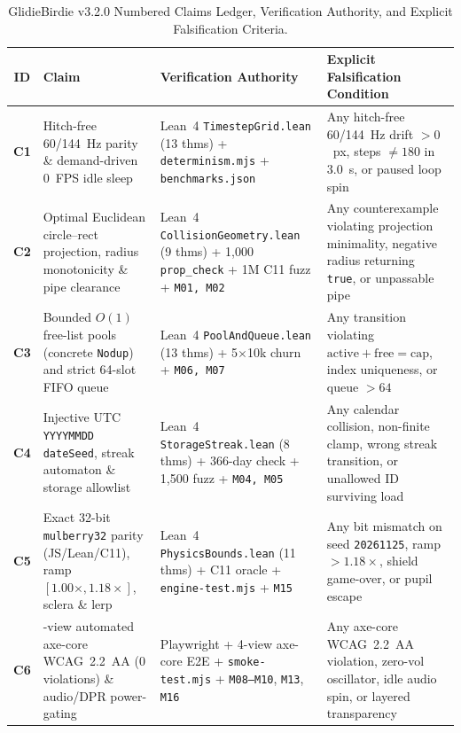 \documentclass[11pt,letterpaper]{article}
\theoremstyle{remark}
\begin{document}
\begin{table}[ht]
\centering
\caption{GlidieBirdie v3.2.0 Numbered Claims Ledger, Verification Authority, and Explicit Falsification Criteria.}
\label{tab:claims}
\footnotesize
\setlength{\tabcolsep}{4pt}
\begin{tabular}{@{} c >{\raggedright\arraybackslash}p{4.2cm} >{\raggedright\arraybackslash}p{4.5cm} >{\raggedright\arraybackslash}p{5.5cm} @{}}
\toprule
\textbf{ID} & \textbf{Claim} & \textbf{Verification Authority} & \textbf{Explicit Falsification Condition} \\
\midrule
\textbf{C1} & Hitch-free 60/144~Hz parity \& demand-driven 0~FPS idle sleep & Lean~4 \texttt{TimestepGrid.lean} (13 thms) + \texttt{determinism.mjs} + \texttt{benchmarks.json} & Any hitch-free 60/144~Hz drift $>0$~px, steps $\neq 180$ in 3.0~s, or paused loop spin \\
\textbf{C2} & Optimal Euclidean circle--rect projection, radius monotonicity \& pipe clearance & Lean~4 \texttt{CollisionGeometry.lean} (9 thms) + 1,000 \texttt{prop\_check} + 1M C11 fuzz + \texttt{M01, M02} & Any counterexample violating projection minimality, negative radius returning \texttt{true}, or unpassable pipe \\
\textbf{C3} & Bounded $O(1)$ free-list pools (concrete \texttt{Nodup}) and strict 64-slot FIFO queue & Lean~4 \texttt{PoolAndQueue.lean} (13 thms) + 5$\times$10k churn + \texttt{M06, M07} & Any transition violating $\text{active}+\text{free}=\text{cap}$, index uniqueness, or queue $>64$ \\
\textbf{C4} & Injective UTC \texttt{YYYYMMDD} \texttt{dateSeed}, streak automaton \& storage allowlist & Lean~4 \texttt{StorageStreak.lean} (8 thms) + 366-day check + 1,500 fuzz + \texttt{M04, M05} & Any calendar collision, non-finite clamp, wrong streak transition, or unallowed ID surviving load \\
\textbf{C5} & Exact 32-bit \texttt{mulberry32} parity (JS/Lean/C11), ramp $[1.00\times,1.18\times]$, sclera \& lerp & Lean~4 \texttt{PhysicsBounds.lean} (11 thms) + C11 oracle + \texttt{engine-test.mjs} + \texttt{M15} & Any bit mismatch on seed \texttt{20261125}, ramp $>1.18\times$, shield game-over, or pupil escape \\
\textbf{C6} & 4-view automated axe-core WCAG~2.2~AA (0 violations) \& audio/DPR power-gating & 7 Playwright + 4-view axe-core E2E + \texttt{smoke-\allowbreak test.mjs} + \texttt{M08--M10}, \texttt{M13}, \texttt{M16} & Any axe-core WCAG~2.2~AA violation, zero-vol oscillator, idle audio spin, or layered transparency \\

\end{tabular}
\end{table}
\end{document}
